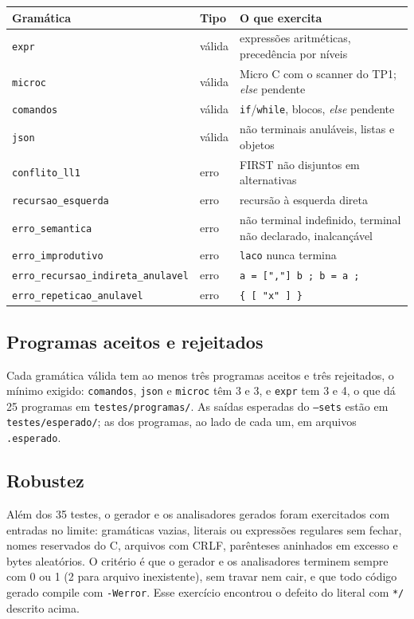 \documentclass[11pt,a4paper]{article}
\begin{document}
\begin{center}
\small
\begin{tabular}{@{}llp{8.2cm}@{}}
\toprule
Gramática & Tipo & O que exercita \\
\midrule
\texttt{expr} & válida & expressões aritméticas, precedência por níveis \\
\texttt{microc} & válida & Micro C com o scanner do TP1; \emph{else} pendente \\
\texttt{comandos} & válida & \texttt{if}/\texttt{while}, blocos, \emph{else} pendente \\
\texttt{json} & válida & não terminais anuláveis, listas e objetos \\
\texttt{conflito\_ll1} & erro & FIRST não disjuntos em alternativas \\
\texttt{recursao\_esquerda} & erro & recursão à esquerda direta \\
\texttt{erro\_semantica} & erro & não terminal indefinido, terminal não declarado, inalcançável \\
\texttt{erro\_improdutivo} & erro & \texttt{laco} nunca termina \\
\texttt{erro\_recursao\_indireta\_anulavel} & erro & \texttt{a = [","] b ; b = a ;} \\
\texttt{erro\_repeticao\_anulavel} & erro & \texttt{\{ [ "x" ] \}} \\
\bottomrule
\end{tabular}
\end{center}

\subsection{Programas aceitos e rejeitados}

Cada gramática válida tem ao menos três programas aceitos e três rejeitados, o mínimo exigido:
\texttt{comandos}, \texttt{json} e \texttt{microc} têm 3 e 3, e \texttt{expr} tem 3 e 4, o que
dá 25 programas em \texttt{testes/programas/}. As saídas esperadas do \texttt{--sets} estão em
\texttt{testes/esperado/}; as dos programas, ao lado de cada um, em arquivos \texttt{.esperado}.

\subsection{Robustez}

Além dos 35 testes, o gerador e os analisadores gerados foram exercitados com entradas no limite:
gramáticas vazias, literais ou expressões regulares sem fechar, nomes reservados do C, arquivos
com CRLF, parênteses aninhados em excesso e bytes aleatórios. O critério é que o gerador e os
analisadores terminem sempre com 0 ou 1 (2 para arquivo inexistente), sem travar nem cair, e que
todo código gerado compile com \texttt{-Werror}. Esse exercício encontrou o defeito do literal
com \texttt{*/} descrito acima.
\end{document}
